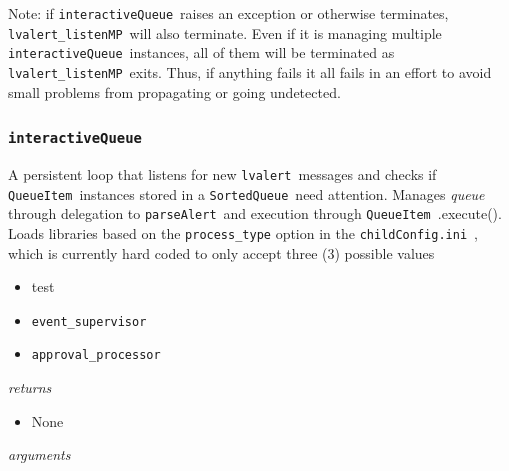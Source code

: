 \documentclass{article}
\newcommand{\alert}{\texttt{lvalert}~}
\newcommand{\lvalertListenMP}{\texttt{lvalert\_listenMP}~}
\newcommand{\interactiveQueue}{\texttt{interactiveQueue}~}
\newcommand{\parseAlert}{\texttt{parseAlert}~}
\newcommand{\SortedQueue}{\texttt{SortedQueue}~}
\newcommand{\QueueItem}{\texttt{QueueItem}~}
\newcommand{\childConfigini}{\texttt{childConfig.ini}~}
\newcommand{\approvalProcessor}{\texttt{approval\_processor}~}
\newcommand{\eventSupervisor}{\texttt{event\_supervisor}~}
\begin{document}
Note: if \interactiveQueue raises an exception or otherwise terminates, \lvalertListenMP will also terminate.
Even if it is managing multiple \interactiveQueue instances, all of them will be terminated as \lvalertListenMP exits.
Thus, if anything fails it all fails in an effort to avoid small problems from propagating or going undetected.


\subsubsection{\interactiveQueue}
\label{sec: interactiveQueue}

A persistent loop that listens for new \alert messages and checks if \QueueItem instances stored in a \SortedQueue need attention. 
Manages \textit{queue} through delegation to \parseAlert and execution through \QueueItem.execute(). 
Loads libraries based on the \texttt{process\_type} option in the \childConfigini, which is currently hard coded to only accept three (3) possible values
\begin{itemize}
    \item{test}
    \item{\eventSupervisor}
    \item{\approvalProcessor}
\end{itemize}

\vspace{0.5cm}
\noindent
\textit{returns}

\begin{itemize}
    \item{None}
\end{itemize}

\noindent
\textit{arguments}
\end{document}
